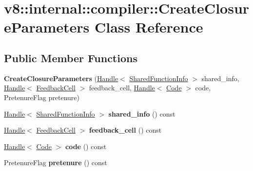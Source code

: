 \hypertarget{classv8_1_1internal_1_1compiler_1_1CreateClosureParameters}{}\section{v8\+:\+:internal\+:\+:compiler\+:\+:Create\+Closure\+Parameters Class Reference}
\label{classv8_1_1internal_1_1compiler_1_1CreateClosureParameters}
\subsection*{Public Member Functions}
\begin{DoxyCompactItemize}
\item 
\mbox{\label{classv8_1_1internal_1_1compiler_1_1CreateClosureParameters_a313aadf3a7ffd8de9271e18d25c8ac40}} 
{\bfseries Create\+Closure\+Parameters} (\mbox{\hyperlink{classv8_1_1internal_1_1Handle}{Handle}}$<$ \mbox{\hyperlink{classv8_1_1internal_1_1SharedFunctionInfo}{Shared\+Function\+Info}} $>$ shared\+\_\+info, \mbox{\hyperlink{classv8_1_1internal_1_1Handle}{Handle}}$<$ \mbox{\hyperlink{classv8_1_1internal_1_1FeedbackCell}{Feedback\+Cell}} $>$ feedback\+\_\+cell, \mbox{\hyperlink{classv8_1_1internal_1_1Handle}{Handle}}$<$ \mbox{\hyperlink{classv8_1_1internal_1_1Code}{Code}} $>$ code, Pretenure\+Flag pretenure)
\item 
\mbox{\label{classv8_1_1internal_1_1compiler_1_1CreateClosureParameters_a7f149223b8d2512ac21b7b5d43cc7af0}} 
\mbox{\hyperlink{classv8_1_1internal_1_1Handle}{Handle}}$<$ \mbox{\hyperlink{classv8_1_1internal_1_1SharedFunctionInfo}{Shared\+Function\+Info}} $>$ {\bfseries shared\+\_\+info} () const
\item 
\mbox{\label{classv8_1_1internal_1_1compiler_1_1CreateClosureParameters_ad4db5b46fe537de807a7537822878c6a}} 
\mbox{\hyperlink{classv8_1_1internal_1_1Handle}{Handle}}$<$ \mbox{\hyperlink{classv8_1_1internal_1_1FeedbackCell}{Feedback\+Cell}} $>$ {\bfseries feedback\+\_\+cell} () const
\item 
\mbox{\label{classv8_1_1internal_1_1compiler_1_1CreateClosureParameters_a67e96c519a14144d10e9aef588f6401e}} 
\mbox{\hyperlink{classv8_1_1internal_1_1Handle}{Handle}}$<$ \mbox{\hyperlink{classv8_1_1internal_1_1Code}{Code}} $>$ {\bfseries code} () const
\item 
\mbox{\label{classv8_1_1internal_1_1compiler_1_1CreateClosureParameters_ad57312830efd1f2f1390ab106a674a07}} 
Pretenure\+Flag {\bfseries pretenure} () const
\end{DoxyCompactItemize}


